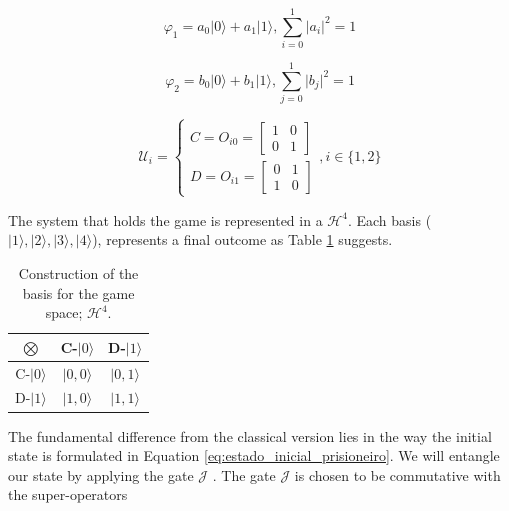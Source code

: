 \begin{equation}
\label{eq:quantum_prisioner_m1}
\varphi_{1}=a_{0}\vert0\rangle+a_{1}\vert1\rangle,\sum_{i=0}^{1}\vert a_{i}\vert^{2}=1
\end{equation}


\begin{equation}
\label{eq:quantum_prisioner_m2}
\varphi_{2}=b_{0}\vert0\rangle+b_{1}\vert1\rangle,\sum_{j=0}^{1}\vert b_{j}\vert^{2}=1
\end{equation}

\begin{equation}
\label{eq:operators_prisioneiros_quanticos}
\mathcal{U}_{i}=\begin{cases}C= 
O_{i0}=\left[\begin{array}{cc}
1 & 0\\
0 & 1
\end{array}\right]\\
D= O_{i1}=\left[\begin{array}{cc}
0 & 1\\
1 & 0
\end{array}\right]
\end{cases} , i \in \{ 1, 2 \}
\end{equation}


The system that holds the game is represented in a $\mathcal{H}^{4}$. Each basis ($\vert 1\rangle, \vert 2\rangle, \vert 3\rangle, \vert 4\rangle$), represents a final outcome as Table \ref{tab:prisioners_m} suggests.

\begin{table}
\begin{centering}
\begin{tabular}{ccc}
\hline 
$\bigotimes$ & C-$\vert 0\rangle$ & D-$\vert 1\rangle$\tabularnewline
\hline 
C-$\vert 0\rangle$ & $\vert 0,0\rangle$ & $\vert 0,1\rangle$\tabularnewline
D-$\vert 1\rangle$ & $\vert 1,0\rangle$ & $\vert 1,1\rangle$\tabularnewline
\hline 
\end{tabular}
\par\end{centering}

\caption{Construction of the basis for the game space; $\mathcal{H}^{4}$.}
\label{tab:prisioners_m}
\end{table}



The fundamental difference from the classical version lies in the way the initial state is formulated in Equation \ref{eq:estado_inicial_prisioneiro}. We will entangle our state by applying the gate $\mathcal{J}$ \cite{Letters2002}\cite{Eisert2008}. The gate $\mathcal{J}$ is chosen to be commutative with the super-operators 

